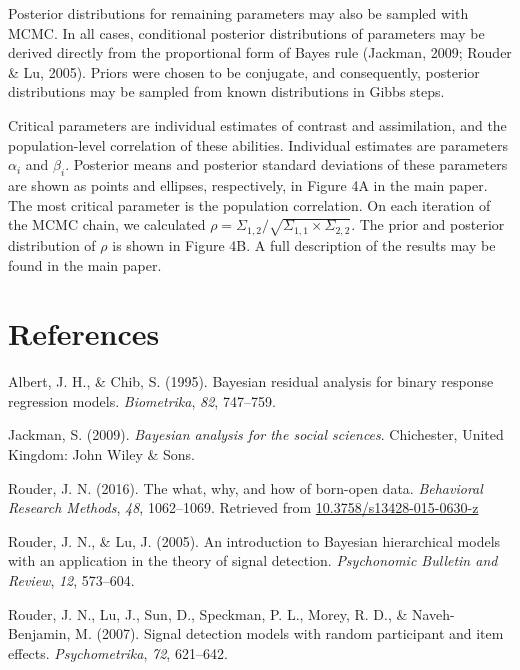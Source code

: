 \documentclass[english,man]{apa6}
\begin{document}
Posterior distributions for remaining parameters may also be sampled
with MCMC. In all cases, conditional posterior distributions of
parameters may be derived directly from the proportional form of Bayes
rule (Jackman, 2009; Rouder \& Lu, 2005). Priors were chosen to be
conjugate, and consequently, posterior distributions may be sampled from
known distributions in Gibbs steps.

Critical parameters are individual estimates of contrast and
assimilation, and the population-level correlation of these abilities.
Individual estimates are parameters \(\alpha_i\) and \(\beta_i\).
Posterior means and posterior standard deviations of these parameters
are shown as points and ellipses, respectively, in Figure 4A in the main
paper. The most critical parameter is the population correlation. On
each iteration of the MCMC chain, we calculated
\(\rho=\Sigma_{1,2}/\sqrt{\Sigma_{1,1}\times \Sigma_{2,2}}\). The prior
and posterior distribution of \(\rho\) is shown in Figure 4B. A full
description of the results may be found in the main paper.

\newpage

\section{References}\label{references}

\setlength{\parindent}{-0.5in} \setlength{\leftskip}{0.5in}

\hypertarget{refs}{}
\hypertarget{ref-Albert:Chib:1995}{}
Albert, J. H., \& Chib, S. (1995). Bayesian residual analysis for binary
response regression models. \emph{Biometrika}, \emph{82}, 747--759.

\hypertarget{ref-Jackman:2009}{}
Jackman, S. (2009). \emph{Bayesian analysis for the social sciences}.
Chichester, United Kingdom: John Wiley \& Sons.

\hypertarget{ref-Rouder:2016}{}
Rouder, J. N. (2016). The what, why, and how of born-open data.
\emph{Behavioral Research Methods}, \emph{48}, 1062--1069. Retrieved
from \url{10.3758/s13428-015-0630-z}

\hypertarget{ref-Rouder:Lu:2005}{}
Rouder, J. N., \& Lu, J. (2005). An introduction to Bayesian
hierarchical models with an application in the theory of signal
detection. \emph{Psychonomic Bulletin and Review}, \emph{12}, 573--604.

\hypertarget{ref-Rouder:etal:2007a}{}
Rouder, J. N., Lu, J., Sun, D., Speckman, P. L., Morey, R. D., \&
Naveh-Benjamin, M. (2007). Signal detection models with random
participant and item effects. \emph{Psychometrika}, \emph{72}, 621--642.
\end{document}
